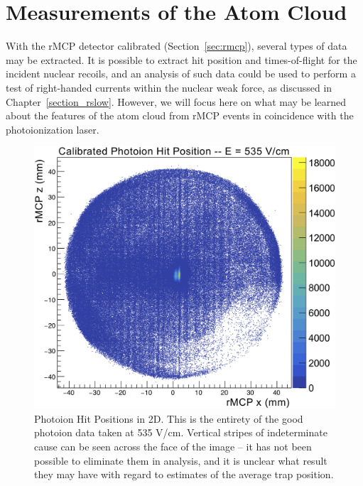 \section{Measurements of the Atom Cloud}
\label{sec:cloud_calibration}
With the rMCP detector calibrated (Section~\ref{sec:rmcp}), several types of data may be extracted.  It is possible to extract hit position and times-of-flight for the incident nuclear recoils, and an analysis of such data could be used to perform a test of right-handed currents within the nuclear weak force, as discussed in Chapter~\ref{section_rslow}.  However, we will focus here on what may be learned about the features of the atom cloud from rMCP events in coincidence with the photoionization laser.~


\begin{figure}[h!tb]
	\centering
	\includegraphics[width=.999\linewidth]
	{Figures/rMCP_PI_2D_535.png}
	\caption[Photoion Hit Positions in 2D]{Photoion Hit Positions in 2D.  This is the entirety of the good photoion data taken at 535 V/cm.  Vertical stripes of indeterminate cause can be seen across the face of the image -- it has not been possible to eliminate them in analysis, and it is unclear what result they may have with regard to estimates of the average trap position.}	
	\label{fig:photoionhits_2D}
\end{figure}

